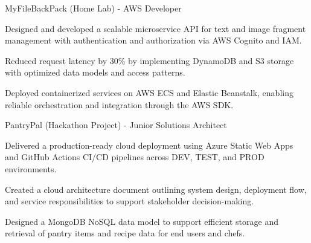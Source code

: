 
\begin{cventries}

\cvproject
{MyFileBackPack (Home Lab) - AWS Developer}
{}
{}
{}
{
  \begin{cvitems}
    \item {Designed and developed a scalable microservice API for text and image fragment management with authentication and authorization via AWS Cognito and IAM.}
    \item {Reduced request latency by 30\% by implementing DynamoDB and S3 storage with optimized data models and access patterns.}
    \item {Deployed containerized services on AWS ECS and Elastic Beanstalk, enabling reliable orchestration and integration through the AWS SDK.}
  \end{cvitems}
}

\cvproject
{PantryPal (Hackathon Project) - Junior Solutions Architect}
{}
{}
{}
{
  \begin{cvitems}
    \item {Delivered a production-ready cloud deployment using Azure Static Web Apps and GitHub Actions CI/CD pipelines across DEV, TEST, and PROD environments.}
    \item {Created a cloud architecture document outlining system design, deployment flow, and service responsibilities to support stakeholder decision-making.}
    \item {Designed a MongoDB NoSQL data model to support efficient storage and retrieval of pantry items and recipe data for end users and chefs.}
  \end{cvitems}
}

\end{cventries}
